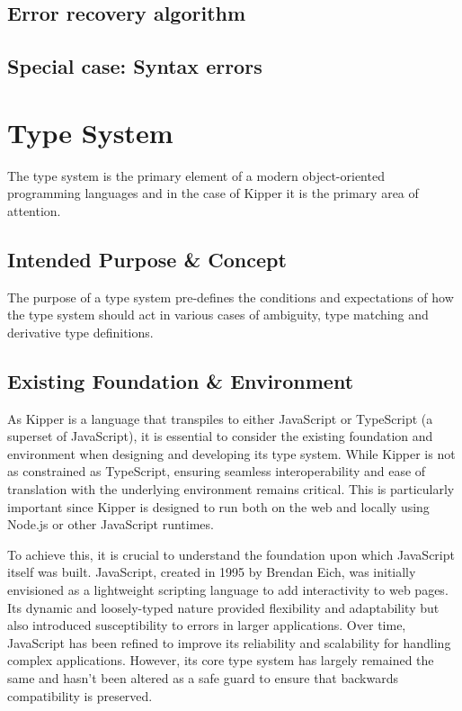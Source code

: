 \subsection{Error recovery algorithm}

\subsection{Special case: Syntax errors}

\section{Type System}
\label{sec:type-system}

The type system is the primary element of a modern object-oriented programming languages and in the case of Kipper it is the primary area of attention.

\subsection{Intended Purpose \& Concept}

The purpose of a type system pre-defines the conditions and expectations of how the type system should act in various cases of ambiguity, type matching and derivative type definitions.

\subsection{Existing Foundation \& Environment}

As Kipper is a language that transpiles to either JavaScript or TypeScript (a superset of JavaScript), it is essential to consider the existing foundation and environment when designing and developing its type system. While Kipper is not as constrained as TypeScript, ensuring seamless interoperability and ease of translation with the underlying environment remains critical. This is particularly important since Kipper is designed to run both on the web and locally using Node.js or other JavaScript runtimes.

To achieve this, it is crucial to understand the foundation upon which JavaScript itself was built. JavaScript, created in 1995 by Brendan Eich, was initially envisioned as a lightweight scripting language to add interactivity to web pages. Its dynamic and loosely-typed nature provided flexibility and adaptability but also introduced susceptibility to errors in larger applications. Over time, JavaScript has been refined to improve its reliability and scalability for handling complex applications. However, its core type system has largely remained the same and hasn't been altered as a safe guard to ensure that backwards compatibility is preserved.

